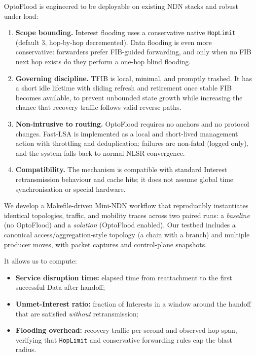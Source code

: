 OptoFlood is engineered to be deployable on existing NDN stacks and robust under load:

\begin{enumerate}
  \item \textbf{Scope bounding.} Interest flooding uses a conservative native \texttt{HopLimit} (default 3, hop-by-hop decremented). Data flooding is even more conservative: forwarders prefer FIB-guided forwarding, and only when no FIB next hop exists do they perform a one-hop blind flooding.
  \item \textbf{Governing discipline.} TFIB is local, minimal, and promptly trashed. It has a short idle lifetime with sliding refresh and retirement once stable FIB becomes available, to prevent unbounded state growth while increasing the chance that recovery traffic follows valid reverse paths.
  \item \textbf{Non-intrusive to routing.} OptoFlood requires no anchors and no protocol changes. Fast-LSA is implemented as a local and short-lived management action with throttling and deduplication; failures are non-fatal (logged only), and the system falls back to normal NLSR convergence.
  \item \textbf{Compatibility.} The mechanism is compatible with standard Interest retransmission behaviour and cache hits; it does not assume global time synchronisation or special hardware.
\end{enumerate}

We develop a Makefile-driven Mini-NDN workflow that reproducibly instantiates identical topologies, traffic, and mobility traces across two paired runs: a \emph{baseline} (no OptoFlood) and a \emph{solution} (OptoFlood enabled). Our testbed includes a canonical access/aggregation-style topology (a chain with a branch) and multiple producer moves, with packet captures and control-plane snapshots.

It allows us to compute:
\begin{itemize}
  \item \textbf{Service disruption time:} elapsed time from reattachment to the first successful Data after handoff;
  \item \textbf{Unmet-Interest ratio:} fraction of Interests in a window around the handoff that are satisfied \emph{without} retransmission;
  \item \textbf{Flooding overhead:} recovery traffic per second and observed hop span, verifying that \texttt{HopLimit} and conservative forwarding rules cap the blast radius.
\end{itemize}

